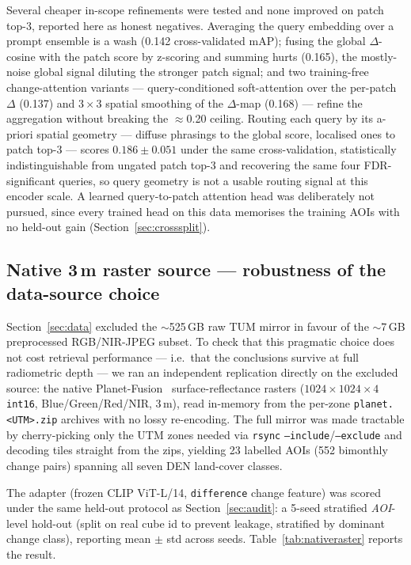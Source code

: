 \documentclass{article}
\begin{document}
\medskip\noindent Several cheaper in-scope refinements were tested and none
improved on patch top-3, reported here as honest negatives. Averaging the query
embedding over a prompt ensemble is a wash (0.142 cross-validated mAP); fusing the
global $\Delta$-cosine with the patch score by z-scoring and summing hurts
(0.165), the mostly-noise global signal diluting the stronger patch signal; and
two training-free change-attention variants --- query-conditioned soft-attention
over the per-patch $\Delta$ (0.137) and $3\times3$ spatial smoothing of the
$\Delta$-map (0.168) --- refine the aggregation without breaking the
$\approx$0.20 ceiling. Routing each query by its a-priori spatial geometry ---
diffuse phrasings to the global score, localised ones to patch top-3 --- scores
$0.186 \pm 0.051$ under the same cross-validation, statistically
indistinguishable from ungated patch top-3 and recovering the same four
FDR-significant queries, so query geometry is not a usable routing signal at
this encoder scale. A learned query-to-patch attention head was deliberately
not pursued, since every trained head on this data memorises the training AOIs
with no held-out gain (Section~\ref{sec:crosssplit}).

\subsection{Native 3\texorpdfstring{\,}{ }m raster source --- robustness of the data-source choice}
\label{sec:nativeraster}

Section~\ref{sec:data} excluded the $\sim$525\,GB raw TUM mirror in favour of the
$\sim$7\,GB preprocessed RGB/NIR-JPEG subset. To check that this pragmatic choice
does not cost retrieval performance --- i.e.\ that the conclusions survive at full
radiometric depth --- we ran an independent replication directly on the excluded
source: the native Planet-Fusion~\cite{planetfusion} surface-reflectance rasters
($1024\times1024\times4$ \texttt{int16}, Blue/Green/Red/NIR, 3\,m), read in-memory
from the per-zone \texttt{planet.<UTM>.zip} archives with no lossy re-encoding. The
full mirror was made tractable by cherry-picking only the UTM zones needed via
\texttt{rsync} \texttt{--include}/\texttt{--exclude} and decoding tiles straight
from the zips, yielding 23 labelled AOIs (552 bimonthly change pairs) spanning all
seven DEN land-cover classes.

The adapter (frozen CLIP ViT-L/14, \texttt{difference} change feature) was scored
under the same held-out protocol as Section~\ref{sec:audit}: a 5-seed stratified
\emph{AOI}-level hold-out (split on real cube id to prevent leakage, stratified by
dominant change class), reporting mean $\pm$ std across seeds.
Table~\ref{tab:nativeraster} reports the result.
\end{document}
